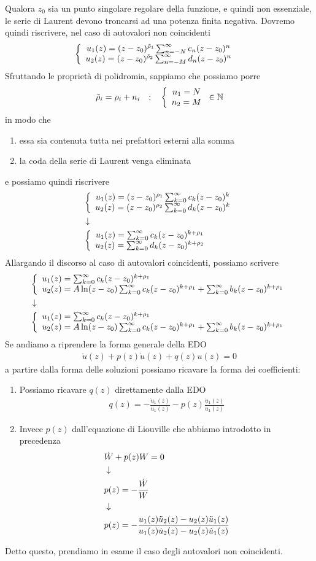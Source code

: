 Qualora $z_0$ sia un punto singolare regolare della funzione, e quindi non essenziale, le serie di Laurent devono troncarsi ad una potenza finita negativa. Dovremo quindi riscrivere, nel caso di autovalori non coincidenti
\begin{align}
	&\left\{ \begin{array}{cc} u_1(z) = (z-z_0)^{\tilde{\rho}_1}\sum_{n = -N}^{\infty} c_n (z-z_0)^n\\ u_2(z) = (z-z_0)^{\tilde{\rho}_2}\sum_{n=-M}^{\infty} d_n (z-z_0)^n \end{array} \right.
\end{align}
Sfruttando le proprietà di polidromia, sappiamo che possiamo porre
\begin{align}
	\tilde{\rho}_i = \rho_i + n_i \quad ; \quad \left\{ \begin{array}{cc} n_1 = N\\ n_2 = M \end{array} \right. \in \mathbb{N}
\end{align} 
in modo che
\begin{enumerate}
	\item essa sia contenuta tutta nei prefattori esterni alla somma
	\item la coda della serie di Laurent venga eliminata
\end{enumerate}
e possiamo quindi riscrivere
\begin{align}
	&\left\{ \begin{array}{cc} u_1(z) = (z-z_0)^{\rho_1}\sum_{k = 0}^{\infty} c_k (z-z_0)^k\\ u_2(z) = (z-z_0)^{\rho_2}\sum_{k=0}^{\infty} d_k (z-z_0)^k \end{array} \right. \\ &\downarrow \nonumber \\
	&\left\{ \begin{array}{cc} u_1(z) = \sum_{k = 0}^{\infty} c_k (z-z_0)^{k+\rho_1}\\ u_2(z) = \sum_{k=0}^{\infty} d_k (z-z_0)^{k + \rho_2} \end{array} \right.
\end{align}
Allargando il discorso al caso di autovalori coincidenti, possiamo scrivere
\begin{align}
	&\double{u_1(z) = \sum_{k = 0}^{\infty} c_k (z-z_0)^{k+\rho_1} \hfill }{u_2(z) = A \ln(z-z_0) \sum_{k = 0}^{\infty} c_k (z-z_0)^{k+\rho_1} + \sum_{k=0}^{\infty}b_k (z-z_0)^{k+\rho_1}} \firstpassage
	&\double{u_1(z) = \sum_{k = 0}^{\infty} c_k (z-z_0)^{k+\rho_1} \hfill }{u_2(z) = A \ln(z-z_0) \sum_{k = 0}^{\infty} c_k (z-z_0)^{k+\rho_1} + \sum_{k=0}^{\infty}b_k (z-z_0)^{k+\rho_1}}
\end{align}
Se andiamo a riprendere la forma generale della EDO
\begin{align}
	\ddot{u}(z) + p(z)\dot{u}(z) + q(z)u(z) = 0
\end{align}
a partire dalla forma delle soluzioni possiamo ricavare la forma dei coefficienti:
\begin{enumerate}
	\item Possiamo ricavare $q(z)$ direttamente dalla EDO
	\begin{align}
		q(z) = - \frac{\ddot{u}_1(z)}{u_1(z)} - p(z)\frac{\dot{u}_1(z)}{u_1(z)}
	\end{align}
	\item Invece $p(z)$ dall'equazione di Liouville che abbiamo introdotto in precedenza
	\begin{align}
		&\dot{W} + p(z) W = 0 \\ &\downarrow \nonumber \\
		& p(z) = - \frac{\dot{W}}{W} \nonumber \\ &\downarrow \nonumber \\
		& p(z) = - \frac{u_1(z) \ddot{u}_2(z) - u_2(z) \ddot{u}_1(z)}{u_1(z) \dot{u}_2(z) - u_2(z) \dot{u}_1(z)} \label{pidizeta}
	\end{align}
\end{enumerate}
Detto questo, prendiamo in esame il caso degli autovalori non coincidenti.

